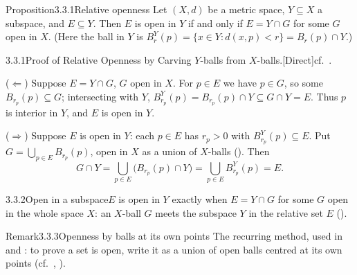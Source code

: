\documentclass[main.tex]{subfiles}
\begin{document}

\begin{Obj}{Proposition}{3.3.1}{Relative openness}
Let $(X,d)$ be a metric space, $Y\subseteq X$ a subspace, and $E\subseteq Y$. Then $E$ is open in
$Y$ if and only if $E=Y\cap G$ for some $G$ open in $X$. (Here the ball in $Y$ is
$B_r^Y(p)=\{x\in Y:d(x,p)<r\}=B_r(p)\cap Y$.)
\end{Obj}
\begin{Prf}{3.3.1}{Proof of Relative Openness by Carving $Y$-balls from $X$-balls.}{[Direct]\quad cf.\ .}
\item ($\Leftarrow$) Suppose $E=Y\cap G$, $G$ open in $X$. For $p\in E$ we have $p\in G$, so some
  $B_{r_p}(p)\subseteq G$; intersecting with $Y$, $B_{r_p}^Y(p)=B_{r_p}(p)\cap Y\subseteq G\cap Y=E$.
  Thus $p$ is interior in $Y$, and $E$ is open in $Y$.
\item ($\Rightarrow$) Suppose $E$ is open in $Y$: each $p\in E$ has $r_p>0$ with $B_{r_p}^Y(p)\subseteq
  E$. Put $G=\bigcup_{p\in E}B_{r_p}(p)$, open in $X$ as a union of $X$-balls (). Then
  \[ G\cap Y=\bigcup_{p\in E}\big(B_{r_p}(p)\cap Y\big)=\bigcup_{p\in E}B_{r_p}^Y(p)=E. \]
\end{Prf}

\begin{Fig}{3.3.2}{Open in a subspace}{$E$ is open in $Y$ exactly when $E=Y\cap G$ for some $G$ open in the whole space $X$: an $X$-ball $G$ meets the subspace $Y$ in the relative set $E$ ().}
\end{Fig}

\begin{ObjL}{Remark}{3.3.3}{Openness by balls at its own points}
The recurring method, used in  and : to prove a set is open, write it as a
union of open balls centred at its own points (cf.\ , ).
\end{ObjL}

\end{document}
